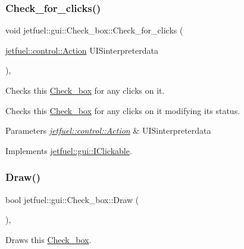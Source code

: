 \subsubsection{\texorpdfstring{Check\+\_\+for\+\_\+clicks()}{Check\_for\_clicks()}}
{\footnotesize\ttfamily void jetfuel\+::gui\+::\+Check\+\_\+box\+::\+Check\+\_\+for\+\_\+clicks (\begin{DoxyParamCaption}\item[{\hyperlink{structjetfuel_1_1control_1_1Action}{jetfuel\+::control\+::\+Action}}]{U\+I\+Sinterpreterdata }\end{DoxyParamCaption})\hspace{0.3cm}{\ttfamily [override]}, {\ttfamily [virtual]}}



Checks this \hyperlink{classjetfuel_1_1gui_1_1Check__box}{Check\+\_\+box} for any clicks on it. 

Checks this \hyperlink{classjetfuel_1_1gui_1_1Check__box}{Check\+\_\+box} for any clicks on it modifying it\textquotesingle{}s status.


\begin{DoxyParams}{Parameters}
{\em \hyperlink{structjetfuel_1_1control_1_1Action}{jetfuel\+::control\+::\+Action}} & U\+I\+Sinterpreterdata \\
\hline
\end{DoxyParams}


Implements \hyperlink{classjetfuel_1_1gui_1_1IClickable_aea45de37bd3beb7eb7e2e3056e4e37b3}{jetfuel\+::gui\+::\+I\+Clickable}.

\mbox{\label{classjetfuel_1_1gui_1_1Check__box_ad2ce6d4af8d950a4ef76b0688541c29a}} 
\subsubsection{\texorpdfstring{Draw()}{Draw()}}
{\footnotesize\ttfamily bool jetfuel\+::gui\+::\+Check\+\_\+box\+::\+Draw (\begin{DoxyParamCaption}{ }\end{DoxyParamCaption})\hspace{0.3cm}{\ttfamily [override]}, {\ttfamily [virtual]}}



Draws this \hyperlink{classjetfuel_1_1gui_1_1Check__box}{Check\+\_\+box}. 

